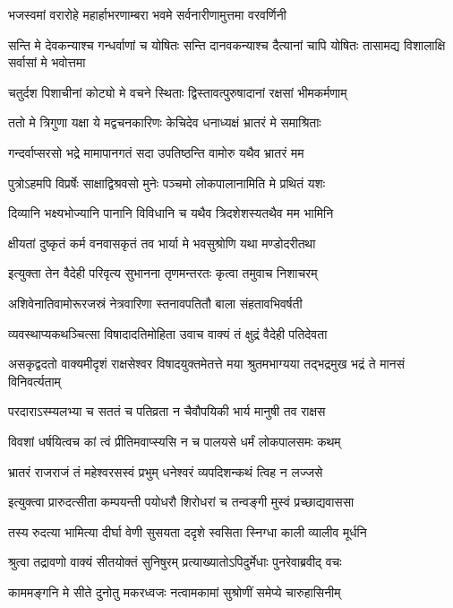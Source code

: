 \twolineshloka
{भजस्वमां वरारोहे महार्हाभरणाम्बरा}
{भवमे सर्वनारीणामुत्तमा वरवर्णिनी}


\threelineshloka
{सन्ति मे देवकन्याश्च गन्धर्वाणां च योषितः}
{सन्ति दानवकन्याश्च दैत्यानां चापि योषितः}
{तासामद्य विशालाक्षि सर्वासां मे भवोत्तमा}


\twolineshloka
{चतुर्दश पिशाचीनां कोट्यो मे वचने स्थिताः}
{द्विस्तावत्पुरुषादानां रक्षसां भीमकर्मणाम्}


\twolineshloka
{ततो मे त्रिगुणा यक्षा ये मद्वचनकारिणः}
{केचिदेव धनाध्यक्षं भ्रातरं मे समाश्रिताः}


\twolineshloka
{गन्दर्वाप्सरसो भद्रे मामापानगतं सदा}
{उपतिष्ठन्ति वामोरु यथैव भ्रातरं मम}


\twolineshloka
{पुत्रोऽहमपि विप्रर्षेः साक्षाद्विश्रवसो मुनेः}
{पञ्चमो लोकपालानामिति मे प्रथितं यशः}


\twolineshloka
{दिव्यानि भक्ष्यभोज्यानि पानानि विविधानि च}
{यथैव त्रिदशेशस्यतथैव मम भामिनि}


\twolineshloka
{क्षीयतां दुष्कृतं कर्म वनवासकृतं तव}
{भार्या मे भवसुश्रोणि यथा मण्डोदरीतथा}


\twolineshloka
{इत्युक्ता तेन वैदेही परिवृत्य सुभानना}
{तृणमन्तरतः कृत्वा तमुवाच निशाचरम्}


\twolineshloka
{अशिवेनातिवामोरूरजस्रं नेत्रवारिणा}
{स्तनावपतितौ बाला संहतावभिवर्षती}


\twolineshloka
{व्यवस्थाप्यकथञ्चित्सा विषादादतिमोहिता}
{उवाच वाक्यं तं क्षुद्रं वैदेही पतिदेवता}


\threelineshloka
{असकृद्वदतो वाक्यमीदृशं राक्षसेश्वर}
{विषादयुक्तमेतत्ते मया श्रुतमभाग्यया}
{तद्भद्रमुख भद्रं ते मानसं विनिवर्त्यताम्}


\twolineshloka
{परदाराऽस्म्यलभ्या च सततं च पतिव्रता}
{न चैवौपयिकी भार्य मानुषी तव राक्षस}


\twolineshloka
{विवशां धर्षयित्वच कां त्वं प्रीतिमवाप्स्यसि}
{न च पालयसे धर्मं लोकपालसमः कथम्}


\twolineshloka
{भ्रातरं राजराजं तं महेश्वरसस्वं प्रभुम्}
{धनेश्वरं व्यपदिशन्कथं त्विह न लज्जसे}


\twolineshloka
{इत्युक्त्वा प्रारुदत्सीता कम्पयन्ती पयोधरौ}
{शिरोधरां च तन्वङ्गी मुस्वं प्रच्छाद्यवाससा}


\twolineshloka
{तस्य रुदत्या भामित्या दीर्घा वेणी सुसयता}
{ददृशे स्वसिता स्निग्धा काली व्यालीव मूर्धनि}


\twolineshloka
{श्रुत्वा तद्रावणो वाक्यं सीतयोक्तं सुनिषुरम्}
{प्रत्याख्यातोऽपिदुर्मेधाः पुनरेवाब्रवीद् वचः}


\twolineshloka
{काममङ्गनि मे सीते दुनोतु मकरध्वजः}
{नत्वामकामां सुश्रोणीं समेप्ये चारुहासिनीम्}


